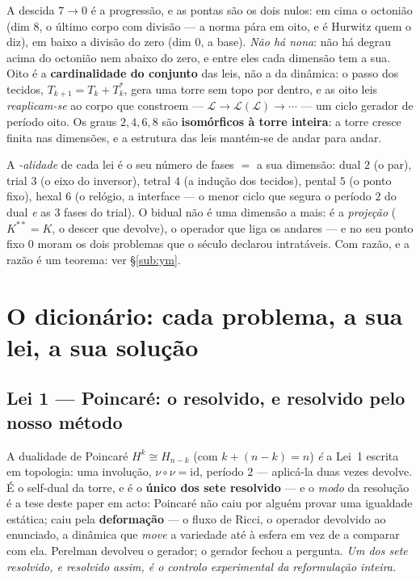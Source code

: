 \documentclass[11pt,a4paper]{article}
\begin{document}
\noindent A descida $7\to0$ é a progressão, e as pontas são os dois nulos: em cima o octonião (dim
$8$, o último corpo com divisão --- a norma pára em oito, e é Hurwitz quem o diz), em baixo a divisão
do zero (dim $0$, a base). \emph{Não há nona}: não há degrau acima do octonião nem abaixo do zero, e
entre eles cada dimensão tem a sua. Oito é a \textbf{cardinalidade do conjunto} das leis, não a da
dinâmica: o passo dos tecidos, $T_{k+1}=T_k+T_k^{*}$, gera uma torre sem topo por dentro, e as oito
leis \emph{reaplicam-se} ao corpo que constroem --- $\mathcal L\to\mathcal L(\mathcal L)\to\cdots$
--- um ciclo gerador de período oito. Os graus $2,4,6,8$ são \textbf{isomórficos à torre inteira}: a
torre cresce finita nas dimensões, e a estrutura das leis mantém-se de andar para andar.

A \emph{-alidade} de cada lei é o seu número de fases $=$ a sua dimensão: dual $2$ (o par), trial $3$
(o eixo do inversor), tetral $4$ (a indução dos tecidos), pental $5$ (o ponto fixo), hexal $6$ (o
relógio, a interface --- o menor ciclo que segura o período $2$ do dual \emph{e} as $3$ fases do
trial). O bidual não é uma dimensão a mais: é a \emph{projeção} ($K^{**}=K$, o descer que devolve),
o operador que liga os andares --- e no seu ponto fixo $0$ moram os dois problemas que o século
declarou intratáveis. Com razão, e a razão é um teorema: ver \S\ref{sub:ym}.

\section{O dicionário: cada problema, a sua lei, a sua solução}\label{sec:dicionario}

\subsection{Lei 1 --- Poincaré: o resolvido, e resolvido pelo nosso método}\label{sub:poincare}

A dualidade de Poincaré $H^{k}\cong H_{n-k}$ (com $k+(n-k)=n$) \emph{é} a Lei~1 escrita em topologia:
uma involução, $\nu\circ\nu=\mathrm{id}$, período $2$ --- aplicá-la duas vezes devolve. É o
self-dual da torre, e é o \textbf{único dos sete resolvido} --- e o \emph{modo} da resolução é a
tese deste paper em acto: Poincaré não caiu por alguém provar uma igualdade estática; caiu pela
\textbf{deformação} --- o fluxo de Ricci, o operador devolvido ao enunciado, a dinâmica que
\emph{move} a variedade até à esfera em vez de a comparar com ela. Perelman devolveu o gerador; o
gerador fechou a pergunta. \emph{Um dos sete resolvido, e resolvido assim, é o controlo experimental
da reformulação inteira.}
\end{document}
